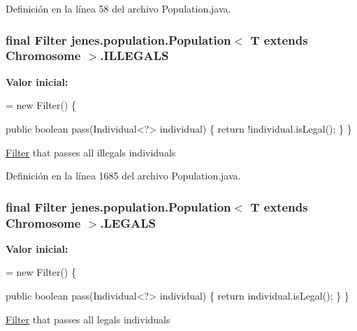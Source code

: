 Definición en la línea 58 del archivo Population.\-java.

\hypertarget{classjenes_1_1population_1_1_population_3_01_t_01extends_01_chromosome_01_4_acbb46d951b86374304f72246d3142bce}{
\subsubsection[{I\-L\-L\-E\-G\-A\-L\-S}]{\setlength{\rightskip}{0pt plus 5cm}final Filter jenes.\-population.\-Population$<$ T extends Chromosome $>$.I\-L\-L\-E\-G\-A\-L\-S\hspace{0.3cm}{\ttfamily [static]}}}\label{classjenes_1_1population_1_1_population_3_01_t_01extends_01_chromosome_01_4_acbb46d951b86374304f72246d3142bce}
{\bfseries Valor inicial\-:}
\begin{DoxyCode}
= \textcolor{keyword}{new} Filter() \{

        \textcolor{keyword}{public} \textcolor{keywordtype}{boolean} pass(Individual<?> individual) \{
            \textcolor{keywordflow}{return} !individual.isLegal();
        \}
    \}
\end{DoxyCode}
\hyperlink{interfacejenes_1_1population_1_1_population_3_01_t_01extends_01_chromosome_01_4_1_1_filter}{Filter} that passes all illegals individuals 

Definición en la línea 1685 del archivo Population.\-java.

\hypertarget{classjenes_1_1population_1_1_population_3_01_t_01extends_01_chromosome_01_4_a99a629869951da716c9efc8be2fdbb70}{
\subsubsection[{L\-E\-G\-A\-L\-S}]{\setlength{\rightskip}{0pt plus 5cm}final Filter jenes.\-population.\-Population$<$ T extends Chromosome $>$.L\-E\-G\-A\-L\-S\hspace{0.3cm}{\ttfamily [static]}}}\label{classjenes_1_1population_1_1_population_3_01_t_01extends_01_chromosome_01_4_a99a629869951da716c9efc8be2fdbb70}
{\bfseries Valor inicial\-:}
\begin{DoxyCode}
= \textcolor{keyword}{new} Filter() \{

        \textcolor{keyword}{public} \textcolor{keywordtype}{boolean} pass(Individual<?> individual) \{
            \textcolor{keywordflow}{return} individual.isLegal();
        \}
    \}
\end{DoxyCode}
\hyperlink{interfacejenes_1_1population_1_1_population_3_01_t_01extends_01_chromosome_01_4_1_1_filter}{Filter} that passes all legals individuals 

